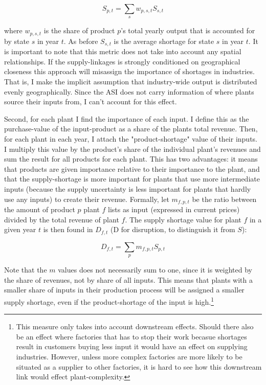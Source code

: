 \documentclass[11pt]{article}
\begin{document}
\[
S_{p,t} =  \sum_s w_{p,s,t} S_{s,t}
\]

where $w_{p,s,t}$ is the share of product $p$'s total yearly output that is accounted for by state $s$ in year $t$. As before $S_{s,t}$ is the average shortage for state $s$ in year $t$. It is important to note that this metric does not take into account any spatial relationships. If the supply-linkages is strongly conditioned on geographical closeness this approach will misassign the importance of shortages in industries. That is, I make the implicit assumption that industry-wide output is distributed evenly geographically. Since the ASI does not carry information of where plants source their inputs from, I can't account for this effect.

Second, for each plant I find the importance of each input. I define this as the purchase-value of the input-product as a share of the plants total revenue. Then, for each plant in each year, I attach the "product-shortage" value of their inputs. I multiply this value by the product's share of the individual plant's revenues and sum the result for all products for each plant. This has two advantages: it means that products are given importance relative to their importance to the plant, and that the supply-shortage is more important for plants that use more intermediate inputs (because the supply uncertainty is less important for plants that hardly use any inputs) to create their revenue. Formally, let $m_{f,p,t}$ be the ratio between the amount of product $p$ plant $f$ lists as input (expressed in current prices) divided by the total revenue of plant $f$. The supply shortage value for plant $f$ in a given year $t$ is then found in $D_{f,t}$ (D for disruption, to distinguish it from $S$):

\[
D_{f,t} = \sum_p m_{f,p,t} S_{p,t}
\]

Note that the $m$ values does not necessarily sum to one, since it is weighted by the share of revenues, not by share of all inputs. This means that plants with a smaller share of inputs in their production process will be assigned a smaller supply shortage, even if the product-shortage of the input is high.\footnote{This measure only takes into account downstream effects. Should there also be an effect where factories that has to stop their work becasue shortages result in customers buying less input it would have an effect on supplying industries. However, unless more complex factories are more likely to be situated as a supplier to other factories, it is hard to see how this downstream link would effect plant-complexity.}
\end{document}
